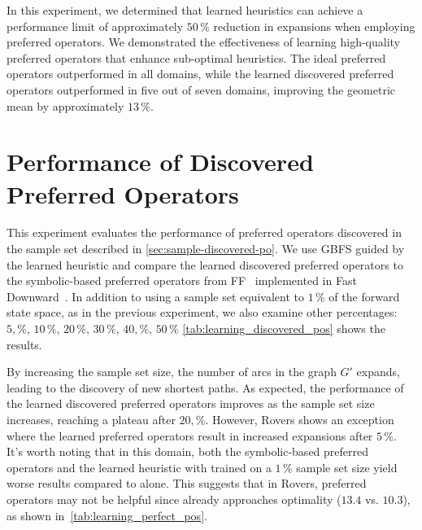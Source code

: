 \documentclass[ppgc,diss,english]{iiufrgs}
\begin{document}
In this experiment, we determined that learned heuristics can achieve a performance limit of approximately $50\,\%$ reduction in expansions when employing preferred operators. We demonstrated the effectiveness of learning high-quality preferred operators that enhance sub-optimal heuristics. The ideal preferred operators \postar outperformed \hnn in all domains, while the learned discovered preferred operators \pog outperformed \hnn in five out of seven domains, improving the geometric mean by approximately $13\,\%$.

\section{Performance of Discovered Preferred Operators}
\label{sec:exp-performance-po}
This experiment evaluates the performance of preferred operators discovered in the sample set described in \cref{sec:sample-discovered-po}. We use GBFS guided by the learned heuristic \hnn and compare the learned discovered preferred operators \pog to the symbolic-based preferred operators \poff from FF~\cite{Hoffmann.Nebel/2001} implemented in Fast Downward~\cite{Helmert/2006}. In addition to using a sample set equivalent to $1\,\%$ of the forward state space, as in the previous experiment, we also examine other percentages: $5,\%$, $10\,\%$, $20\,\%$, $30\,\%$, $40,\%$, $50\,\%$ \cref{tab:learning_discovered_pos} shows the results.



By increasing the sample set size, the number of arcs in the graph $G'$ expands, leading to the discovery of new shortest paths. As expected, the performance of the learned discovered preferred operators \pog improves as the sample set size increases, reaching a plateau after $20,\%$. However, Rovers shows an exception where the learned preferred operators result in increased expansions after $5\,\%$. It's worth noting that in this domain, both the symbolic-based preferred operators \poff and the learned heuristic \hnn with \pog trained on a $1\,\%$ sample set size yield worse results compared to \hnn alone. This suggests that in Rovers, preferred operators may not be helpful since \hnn already approaches optimality ($13.4$ vs. $10.3$), as shown in~\cref{tab:learning_perfect_pos}.
\end{document}
